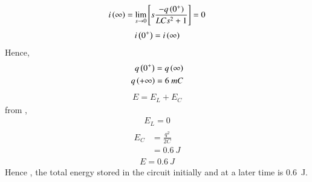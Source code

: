 \documentclass[beamer]{IEEEtran}
\theoremstyle{remark}
\begin{document}
\begin{align}
   i\left(\infty\right)=\lim_{s\to0}\left[s\frac{-q\left(0^{+}\right)}{LCs^2+1}\right]=0 
\end{align}
\begin{align}
    i\left(0^{+}\right)=i\left(\infty\right)
\end{align}
Hence,
\begin{align}
    q\left(0^{+}\right)=q\left(\infty\right)\\
    q\left(+\infty\right)=6\ mC
\end{align}
\begin{align}
    E=E_L+E_C
\end{align}
from ,
\begin{align}
    E_L=0
\end{align}
\begin{gather}
\begin{align}
	E_C&=\frac{q^2}{2C}\\
       &=0.6\ J
\end{align}
\end{gather}
\begin{align}
    E=0.6\ J
\end{align}
Hence , the total energy stored in the circuit initially and at a later time is 0.6\ J.
\end{document}

